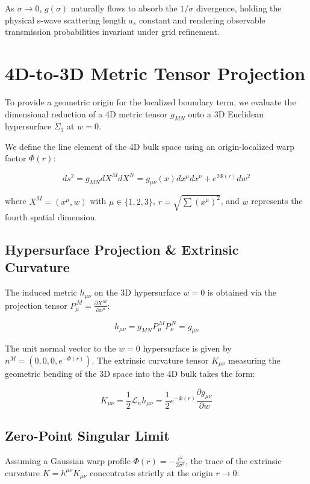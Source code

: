 \documentclass[11pt,a4paper]{article}
\begin{document}
As $\sigma \to 0$, $g(\sigma)$ naturally flows to absorb the $1/\sigma$ divergence, holding the physical s-wave scattering length $a_s$ constant and rendering observable transmission probabilities invariant under grid refinement.

\section{4D-to-3D Metric Tensor Projection}
To provide a geometric origin for the localized boundary term, we evaluate the dimensional reduction of a 4D metric tensor $g_{MN}$ onto a 3D Euclidean hypersurface $\Sigma_3$ at $w=0$. 

We define the line element of the 4D bulk space using an origin-localized warp factor $\Phi(r)$:

\begin{equation}
ds^2 = g_{MN} dX^M dX^N = g_{\mu\nu}(x) dx^\mu dx^\nu + e^{2\Phi(r)} dw^2
\end{equation}

where $X^M = (x^\mu, w)$ with $\mu \in \{1, 2, 3\}$, $r = \sqrt{\sum (x^\mu)^2}$, and $w$ represents the fourth spatial dimension.

\subsection{Hypersurface Projection \& Extrinsic Curvature}
The induced metric $h_{\mu\nu}$ on the 3D hypersurface $w = 0$ is obtained via the projection tensor $P^{\,M}_{\mu} = \frac{\partial X^M}{\partial x^\mu}$:

\begin{equation}
h_{\mu\nu} = g_{MN} P^{\,M}_{\mu} P^{\,N}_{\nu} = g_{\mu\nu}
\end{equation}

The unit normal vector to the $w=0$ hypersurface is given by $n^M = (0, 0, 0, e^{-\Phi(r)})$. The extrinsic curvature tensor $K_{\mu\nu}$ measuring the geometric bending of the 3D space into the 4D bulk takes the form:

\begin{equation}
K_{\mu\nu} = \frac{1}{2} \mathcal{L}_n h_{\mu\nu} = \frac{1}{2} e^{-\Phi(r)} \frac{\partial g_{\mu\nu}}{\partial w}
\end{equation}

\subsection{Zero-Point Singular Limit}
Assuming a Gaussian warp profile $\Phi(r) = -\frac{r^2}{2\sigma^2}$, the trace of the extrinsic curvature $K = h^{\mu\nu} K_{\mu\nu}$ concentrates strictly at the origin $r \to 0$:
\end{document}

